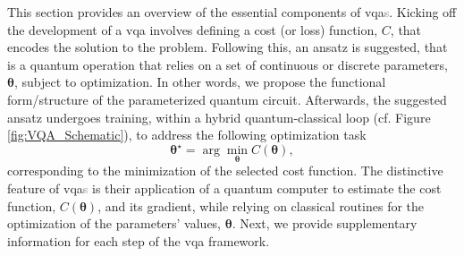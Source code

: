 This section provides an overview of the essential components of \acrshort{vqa}\textcolor{gray}{s}. Kicking off the development of a \acrshort{vqa} involves defining a cost (or loss) function, $C$, that encodes the solution to the problem. Following this, an ansatz is suggested, that is a quantum operation that relies on a set of continuous or discrete parameters, $\boldsymbol{\theta}$, subject to optimization. In other words, we propose the functional form/structure of the parameterized quantum circuit. Afterwards, the suggested ansatz undergoes training, within a hybrid quantum-classical loop (cf. Figure \ref{fig:VQA_Schematic}), to address the following optimization task
\begin{equation}\label{eq:Optimization}
  \boldsymbol{\theta}^{\star} = \arg \min_{\boldsymbol{\theta}} C(\boldsymbol{\theta}),
\end{equation}
corresponding to the minimization of the selected cost function. The distinctive feature of \acrshort{vqa}\textcolor{gray}{s} is their application of a quantum computer to estimate the cost function, $C(\boldsymbol{\theta})$, and its gradient, while relying on classical routines for the optimization of the parameters' values, $\boldsymbol{\theta}$. Next, we provide supplementary information for each step of the \acrshort{vqa} framework.

